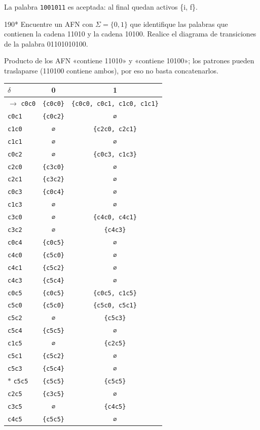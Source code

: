 \documentclass[11pt]{article}
\begin{document}
\resp La palabra \texttt{1001011} es aceptada: al final quedan activos \{i, f\}.


\begin{ejercicio}{190}{*}
Encuentre un AFN con $\Sigma = \{0, 1\}$ que identifique las palabras que contienen la cadena 11010 y la cadena 10100. Realice el diagrama de transiciones de la palabra 01101010100.
\end{ejercicio}
\proc Producto de los AFN «contiene 11010» y «contiene 10100»; los patrones pueden traslaparse (110100 contiene ambos), por eso no basta concatenarlos.
\begin{center}\small\begin{tabular}{lcc}\toprule
$\delta$ & 0 & 1 \\\midrule
$\to$ \texttt{c0c0} & \texttt{\{c0c0\}} & \texttt{\{c0c0, c0c1, c1c0, c1c1\}} \\
 \texttt{c0c1} & \texttt{\{c0c2\}} & \texttt{∅} \\
 \texttt{c1c0} & \texttt{∅} & \texttt{\{c2c0, c2c1\}} \\
 \texttt{c1c1} & \texttt{∅} & \texttt{∅} \\
 \texttt{c0c2} & \texttt{∅} & \texttt{\{c0c3, c1c3\}} \\
 \texttt{c2c0} & \texttt{\{c3c0\}} & \texttt{∅} \\
 \texttt{c2c1} & \texttt{\{c3c2\}} & \texttt{∅} \\
 \texttt{c0c3} & \texttt{\{c0c4\}} & \texttt{∅} \\
 \texttt{c1c3} & \texttt{∅} & \texttt{∅} \\
 \texttt{c3c0} & \texttt{∅} & \texttt{\{c4c0, c4c1\}} \\
 \texttt{c3c2} & \texttt{∅} & \texttt{\{c4c3\}} \\
 \texttt{c0c4} & \texttt{\{c0c5\}} & \texttt{∅} \\
 \texttt{c4c0} & \texttt{\{c5c0\}} & \texttt{∅} \\
 \texttt{c4c1} & \texttt{\{c5c2\}} & \texttt{∅} \\
 \texttt{c4c3} & \texttt{\{c5c4\}} & \texttt{∅} \\
 \texttt{c0c5} & \texttt{\{c0c5\}} & \texttt{\{c0c5, c1c5\}} \\
 \texttt{c5c0} & \texttt{\{c5c0\}} & \texttt{\{c5c0, c5c1\}} \\
 \texttt{c5c2} & \texttt{∅} & \texttt{\{c5c3\}} \\
 \texttt{c5c4} & \texttt{\{c5c5\}} & \texttt{∅} \\
 \texttt{c1c5} & \texttt{∅} & \texttt{\{c2c5\}} \\
 \texttt{c5c1} & \texttt{\{c5c2\}} & \texttt{∅} \\
 \texttt{c5c3} & \texttt{\{c5c4\}} & \texttt{∅} \\
$*$ \texttt{c5c5} & \texttt{\{c5c5\}} & \texttt{\{c5c5\}} \\
 \texttt{c2c5} & \texttt{\{c3c5\}} & \texttt{∅} \\
 \texttt{c3c5} & \texttt{∅} & \texttt{\{c4c5\}} \\
 \texttt{c4c5} & \texttt{\{c5c5\}} & \texttt{∅} \\
\bottomrule\end{tabular}\end{center}
\end{document}

